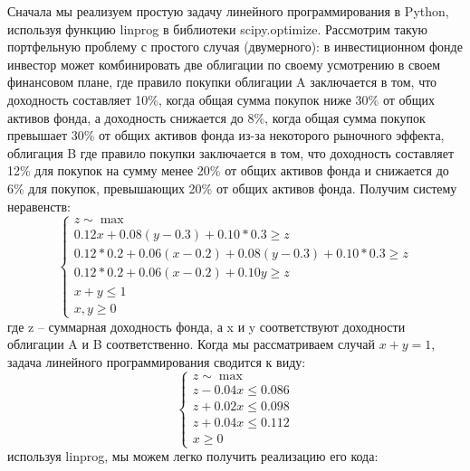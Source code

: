\documentclass[12pt, a4paper, oneside]{article}
\begin{document}
			Сначала мы реализуем простую задачу линейного программирования в Python, используя функцию linprog в библиотеки scipy.optimize. Рассмотрим такую портфельную проблему с простого случая (двумерного): в инвестиционном фонде инвестор может комбинировать две облигации по своему усмотрению в своем финансовом плане, где правило покупки облигации A заключается в том, что доходность составляет 10\%, когда общая сумма покупок ниже 30\% от общих активов фонда, а доходность снижается до 8\%, когда общая сумма покупок превышает 30\% от общих активов фонда из-за некоторого рыночного эффекта, облигация B где правило покупки заключается в том, что доходность составляет 12\% для покупок на сумму менее 20\% от общих активов фонда и снижается до 6\% для покупок, превышающих 20\% от общих активов фонда. Получим систему неравенств:
			\begin{equation*}
				\left\{
				\begin{array}{lr}
					z \sim \displaystyle\max\\
					0.12x+0.08(y-0.3)+0.10*0.3 \ge z\\
					0.12*0.2+0.06(x-0.2)+0.08(y-0.3)+0.10*0.3 \ge z\\
					0.12*0.2+0.06(x-0.2)+0.10y \ge z\\
					x+y\le 1\\
					x,y \ge 0
				\end{array}
				\right.
			\end{equation*}
			где z -- суммарная доходность фонда, а x и y соответствуют доходности облигации A и B соответственно. Когда мы рассматриваем случай $x + y = 1$, задача линейного программирования сводится к виду:
			\begin{equation*}
				\left\{
				\begin{array}{lr}
					z \sim \displaystyle\max\\
					z - 0.04x \le 0.086\\
					z + 0.02x \le 0.098\\
					z + 0.04x \le 0.112\\
					x\ge 0
				\end{array}
				\right.
			\end{equation*}
			используя linprog, мы можем легко получить реализацию его кода:
			
\end{document}
